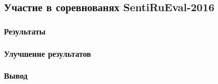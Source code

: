 \subsection{Участие в соревнованях SentiRuEval-2016}
    \subsubsection{Результаты}
    \subsubsection{Улучшение результатов}
    \subsubsection{Вывод}
